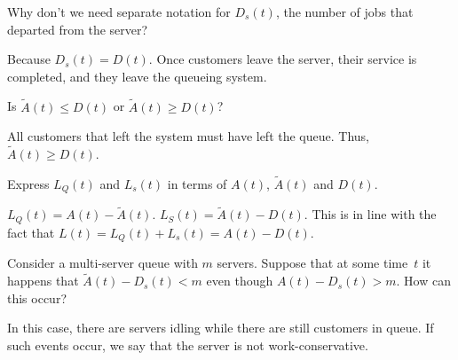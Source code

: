 \begin{exercise}
Why don't we need separate notation for $D_s(t)$, the number
    of jobs that departed from the server? 
\begin{solution}
 Because $D_s(t) = D(t)$. Once customers leave the server,
    their service is completed, and they leave the queueing system.
  \end{solution}
\end{exercise}



\begin{exercise}
 Is $\tilde A(t) \leq D(t)$ or $\tilde A(t) \geq D(t)$?
\begin{solution}
 All customers that left the system must have left the
    queue. Thus, $\tilde A(t) \geq D(t)$.
  \end{solution}
\end{exercise}




\begin{exercise}
 Express $L_Q(t)$ and $L_s(t)$ in terms of $A(t)$, $\tilde A(t)$ and $D(t)$.
\begin{solution}
 $L_Q(t) = A(t) - \tilde A(t)$. $L_S(t) = \tilde A(t) - D(t)$. This is in
    line with the fact that $L(t) = L_Q(t) + L_s(t) = A(t) - D(t)$. 
\end{solution}
\end{exercise}

\begin{exercise}
 Consider a multi-server queue with $m$ servers. Suppose that
    at some time~$t$ it happens that $\tilde A(t) - D_s(t) < m$ even though
    $A(t) - D_s(t) > m$. How can this occur? 
\begin{solution}
 In this case, there are servers idling while there are still
    customers in queue. If such events occur, we say that the server
    is not work-conservative.
\end{solution}
\end{exercise}


